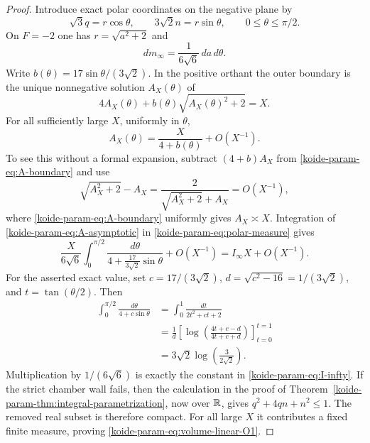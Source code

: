 \begin{proof}
Introduce exact polar coordinates on the negative plane by
\begin{equation}
 \sqrt3q=r\cos\theta,\qquad
 3\sqrt2n=r\sin\theta,\qquad
 0\leq\theta\leq\pi/2.
 \label{koide-param-eq:polar}
\end{equation}
On $F=-2$ one has $r=\sqrt{a^2+2}$ and
\begin{equation}
 dm_\infty=\frac1{6\sqrt6}\,da\,d\theta.
 \label{koide-param-eq:polar-measure}
\end{equation}
Write $b(\theta)=17\sin\theta/(3\sqrt2)$.  In the positive orthant the
outer boundary is the unique nonnegative solution $A_X(\theta)$ of
\begin{equation}
 4A_X(\theta)+b(\theta)\sqrt{A_X(\theta)^2+2}=X.
 \label{koide-param-eq:A-boundary}
\end{equation}
For all sufficiently large $X$, uniformly in $\theta$,
\begin{equation}
 A_X(\theta)=\frac{X}{4+b(\theta)}+O(X^{-1}).
 \label{koide-param-eq:A-asymptotic}
\end{equation}
To see this without a formal expansion, subtract
$(4+b)A_X$ from \eqref{koide-param-eq:A-boundary} and use
\[
 \sqrt{A_X^2+2}-A_X
 =\frac2{\sqrt{A_X^2+2}+A_X}=O(X^{-1}),
\]
where \eqref{koide-param-eq:A-boundary} uniformly gives $A_X\asymp X$.
Integration of \eqref{koide-param-eq:A-asymptotic} in
\eqref{koide-param-eq:polar-measure} gives
\[
 \frac{X}{6\sqrt6}\int_0^{\pi/2}
 \frac{d\theta}{4+\frac{17}{3\sqrt2}\sin\theta}+O(X^{-1})
 =I_\infty X+O(X^{-1}).
\]
For the asserted exact value, set
$c=17/(3\sqrt2)$, $d=\sqrt{c^2-16}=1/(3\sqrt2)$, and
$t=\tan(\theta/2)$.  Then
\begin{align*}
 \int_0^{\pi/2}\frac{d\theta}{4+c\sin\theta}
 &=\int_0^1\frac{dt}{2t^2+ct+2}\\
 &=\frac1d
   \left[\log\!\left(\frac{4t+c-d}{4t+c+d}\right)\right]_{t=0}^{t=1}\\
 &=3\sqrt2\log\!\left(\frac3{2\sqrt2}\right).
\end{align*}
Multiplication by $1/(6\sqrt6)$ is exactly the constant in
\eqref{koide-param-eq:I-infty}.
If the strict chamber wall fails, then the calculation in the proof of
Theorem~\ref{koide-param-thm:integral-parametrization}, now over $\mathbb R$, gives
$q^2+4qn+n^2\leq1$.  The removed real subset is therefore compact.
For all large $X$ it contributes a fixed finite measure, proving
\eqref{koide-param-eq:volume-linear-O1}.


\end{proof}
